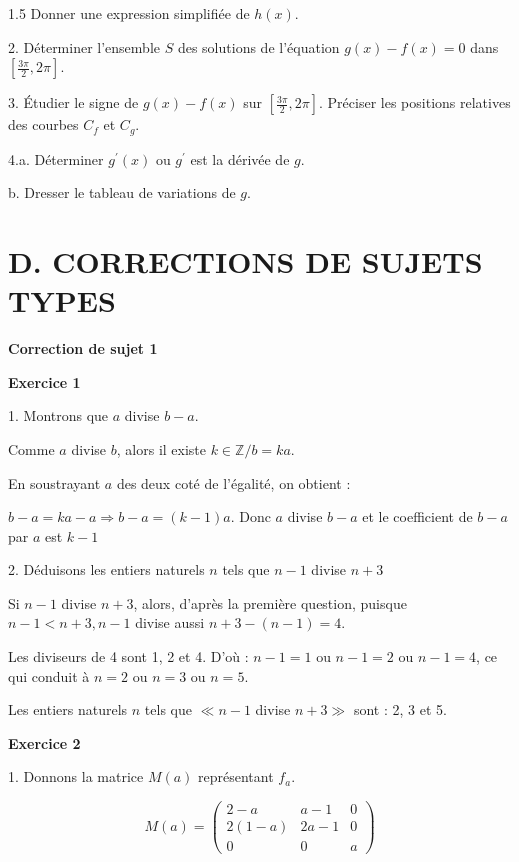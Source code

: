 \documentclass[12pt]{article}
\begin{document}
\begin{spacing}{1.5}
Donner une expression simplifiée de $h(x)$.

2. Déterminer l'ensemble $S$ des solutions de l'équation $g(x)-f(x)=0$ dans $[\frac{3\pi}{2},2\pi]$.

3. Étudier le signe de $g(x)-f(x)$ sur $[\frac{3\pi}{2},2\pi]$. Préciser les positions relatives des courbes $C_f$ et $C_g$.

4.a. Déterminer $g^{\prime}(x)$ ou $g^{\prime}$ est la dérivée de $g$.

b. Dresser le tableau de variations de $g$.












\newpage







\section*{\textbf{D. CORRECTIONS DE SUJETS TYPES}}

\textbf{Correction de sujet 1}

\medskip\textbf{Exercice 1}

1. Montrons que $a$ divise $b-a$.

Comme $a$ divise $b$, alors il existe $k\in \mathbb{Z}/b=ka$.

En soustrayant $a$ des deux coté de l'égalité, on obtient : 

$b-a=ka-a\Longrightarrow b-a=(k-1)a$. Donc $a$ divise $b-a$ et le coefficient de $b-a$ par $a$ est $k-1$

2. Déduisons les entiers naturels $n$ tels que $n-1$ divise $n + 3$ 

Si $n-1$ divise $n+3$, alors, d'après la première question, puisque $n-1 < n + 3, n-1$ divise aussi $n+3 - (n-1) = 4$.

Les diviseurs de 4 sont 1, 2 et 4. D'où : $n-1 =1$ ou $n-1= 2$ ou $n-1 = 4$, ce qui conduit à $n = 2$ ou $n = 3$ ou $n =5$. 

Les entiers naturels $n$ tels que $\ll n-1$ divise $n+3\gg$ sont : 2, 3 et 5.

\medskip\textbf{Exercice 2}

1. Donnons la matrice $M(a)$ représentant $f_a$.

\[
M(a)=\begin{pmatrix}
2-a & a-1  &0 \\
2(1-a) & 2a-1&0\\
0&0&a
\end{pmatrix}
\]


\end{spacing}
\end{document}
